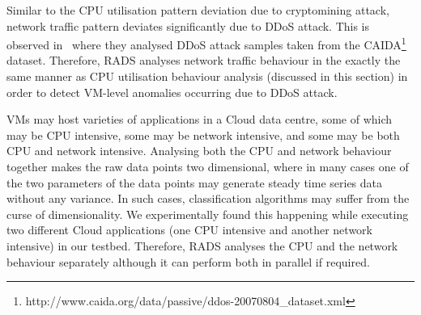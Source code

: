 
Similar to the CPU utilisation pattern deviation due to cryptomining attack, network traffic pattern deviates significantly due to DDoS attack. This is observed in~\cite{ddso_charater_2017} where they analysed DDoS attack samples taken from the CAIDA\footnote{http://www.caida.org/data/passive/ddos-20070804\_dataset.xml} dataset. Therefore, RADS analyses network traffic behaviour in the exactly the same manner as CPU utilisation behaviour analysis (discussed in this section) in order to detect VM-level anomalies occurring due to DDoS attack.

VMs may host varieties of applications in a Cloud data centre, some of which may be CPU intensive, some may be network intensive, and some may be both CPU and network intensive. Analysing both the CPU and network behaviour together makes the raw data points two dimensional, where in many cases one of the two parameters of the data points may generate steady time series data without any variance. In such cases, classification algorithms may suffer from the curse of dimensionality. We experimentally found this happening while executing two different Cloud applications (one CPU intensive and another network intensive) in our testbed. Therefore, RADS analyses the CPU and the network behaviour separately although it can perform both in parallel if required. 


